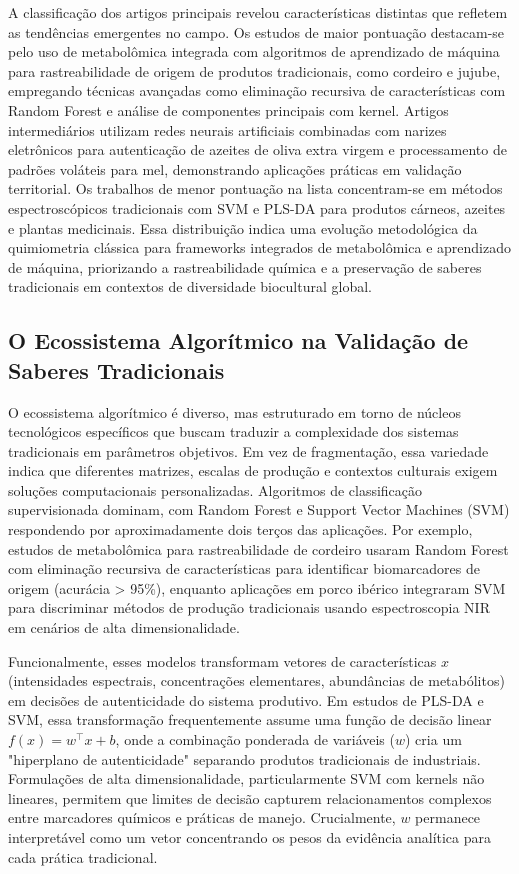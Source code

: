 A classificação dos artigos principais revelou características distintas que refletem as tendências emergentes no campo. Os estudos de maior pontuação destacam-se pelo uso de metabolômica integrada com algoritmos de aprendizado de máquina para rastreabilidade de origem de produtos tradicionais, como cordeiro e jujube, empregando técnicas avançadas como eliminação recursiva de características com Random Forest e análise de componentes principais com kernel. Artigos intermediários utilizam redes neurais artificiais combinadas com narizes eletrônicos para autenticação de azeites de oliva extra virgem e processamento de padrões voláteis para mel, demonstrando aplicações práticas em validação territorial. Os trabalhos de menor pontuação na lista concentram-se em métodos espectroscópicos tradicionais com SVM e PLS-DA para produtos cárneos, azeites e plantas medicinais. Essa distribuição indica uma evolução metodológica da quimiometria clássica para frameworks integrados de metabolômica e aprendizado de máquina, priorizando a rastreabilidade química e a preservação de saberes tradicionais em contextos de diversidade biocultural global.

\subsection{O Ecossistema Algorítmico na Validação de Saberes Tradicionais}

O ecossistema algorítmico é diverso, mas estruturado em torno de núcleos tecnológicos específicos que buscam traduzir a complexidade dos sistemas tradicionais em parâmetros objetivos. Em vez de fragmentação, essa variedade indica que diferentes matrizes, escalas de produção e contextos culturais exigem soluções computacionais personalizadas. Algoritmos de classificação supervisionada dominam, com Random Forest e Support Vector Machines (SVM) respondendo por aproximadamente dois terços das aplicações. Por exemplo, estudos de metabolômica para rastreabilidade de cordeiro usaram Random Forest com eliminação recursiva de características para identificar biomarcadores de origem (acurácia > 95\%), enquanto aplicações em porco ibérico integraram SVM para discriminar métodos de produção tradicionais usando espectroscopia NIR em cenários de alta dimensionalidade.

Funcionalmente, esses modelos transformam vetores de características $x$ (intensidades espectrais, concentrações elementares, abundâncias de metabólitos) em decisões de autenticidade do sistema produtivo. Em estudos de PLS-DA e SVM, essa transformação frequentemente assume uma função de decisão linear $f(x) = w^\top x + b$, onde a combinação ponderada de variáveis ($w$) cria um "hiperplano de autenticidade" separando produtos tradicionais de industriais. Formulações de alta dimensionalidade, particularmente SVM com kernels não lineares, permitem que limites de decisão capturem relacionamentos complexos entre marcadores químicos e práticas de manejo. Crucialmente, $w$ permanece interpretável como um vetor concentrando os pesos da evidência analítica para cada prática tradicional.

